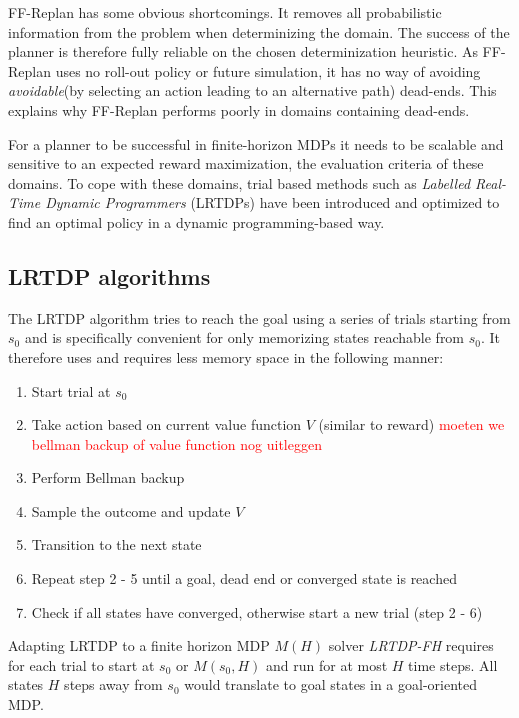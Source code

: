 \documentclass[runningheads,a4paper]{llncs}
\newcommand\myworries[1]{\textcolor{red}{#1}}
\begin{document}
FF-Replan has some obvious shortcomings. It removes all probabilistic information from the problem when determinizing the domain. The success of the planner is therefore fully reliable on the chosen determinization heuristic. As FF-Replan uses no roll-out policy or future simulation, it has no way of avoiding \emph{avoidable}(by selecting an action leading to an alternative path) dead-ends. This explains why FF-Replan performs poorly in domains containing dead-ends.

For a planner to be successful in finite-horizon MDPs it needs to be scalable and sensitive to an expected reward maximization, the evaluation criteria of these domains. To cope with these domains, trial based methods such as \emph{Labelled Real-Time Dynamic Programmers} (LRTDPs) have been introduced and optimized to find an optimal policy in a dynamic programming-based way.


\subsection{LRTDP algorithms}

The LRTDP algorithm tries to reach the goal using a series of trials starting from $s_0$ and is specifically convenient for only memorizing states reachable from $s_0$. It therefore uses and requires less memory space in the following manner:

\begin{enumerate}
	\item Start trial at $s_0$
	\item Take action based on current value function $V$ (similar to reward) \myworries{moeten we bellman backup of value function nog uitleggen}
	\item Perform Bellman backup
	\item Sample the outcome and update $V$
	\item Transition to the next state
	\item Repeat step 2 - 5 until a goal, dead end or converged state is reached
	\item Check if all states have converged, otherwise start a new trial (step 2 - 6)
\end{enumerate}

Adapting LRTDP to a finite horizon MDP $M(H)$ solver \emph{LRTDP-FH} requires for each trial to start at $s_0$ or $M(s_0, H)$ and run for at most $H$ time steps. All states $H$ steps away from $s_0$ would translate to goal states in a goal-oriented MDP. \\
\end{document}
